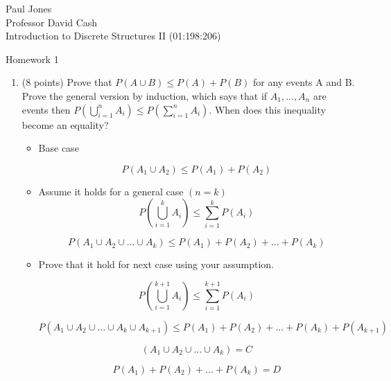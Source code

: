 \documentclass[11pt]{article}
\begin{document}
{
\noindent Paul Jones\\
Professor David Cash  \\
Introduction to Discrete Structures II (01:198:206) \\
\begin{center}
Homework 1
\end{center}
}

\begin{enumerate}

\item (8 points) Prove that $P(A \cup B) \le P(A) + P(B)$ for any events A and B. Prove the general version by induction, which says that if $A_1, ..., A_n$ are events then 
$P(\bigcup_{i = 1}^n A_i) \le P(\sum_{i = 1}^n A_i)$. When does this inequality become an equality?

\begin{itemize}

\item Base case 

\begin{equation*}
P(A_1 \cup A_2) \le P(A_1) + P(A_2)
\end{equation*}

\item Assume it holds for a general case $(n=k)$
\begin{equation*}
P\left(\bigcup_{i = 1}^k A_i\right) \le \sum_{i = 1}^k P(A_i)
\end{equation*}

\begin{equation*}
P(A_1 \cup A_2 \cup ... \cup A_k) \le P(A_1) + P(A_2) + ... + P(A_k)
\end{equation*}

\item Prove that it hold for next case using your assumption.

\begin{equation*}
P\left(\bigcup_{i = 1}^{k+1} A_i\right) \le \sum_{i = 1}^{k+1} P(A_i)
\end{equation*}

\begin{equation*}
P(A_1 \cup A_2 \cup ... \cup A_k \cup A_{k+1}) \le P(A_1) + P(A_2) + ... + P(A_k) + P(A_{k+1})
\end{equation*}

\begin{equation*}
(A_1 \cup A_2 \cup ... \cup A_k) = C
\end{equation*}

\begin{equation*}
 P(A_1) + P(A_2) + ... + P(A_k) = D
\end{equation*}


\end{itemize}
\end{enumerate}
\end{document}
